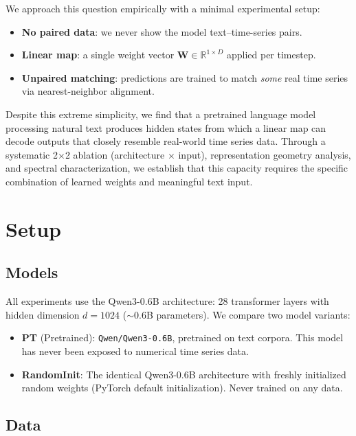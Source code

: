 \documentclass[11pt,a4paper]{article}
\newcommand{\R}{\mathbb{R}}
\newcommand{\bW}{\mathbf{W}}
\begin{document}
We approach this question empirically with a minimal experimental setup:
\begin{itemize}[nosep]
    \item \textbf{No paired data}: we never show the model text--time-series pairs.
    \item \textbf{Linear map}: a single weight vector $\bW \in \R^{1 \times D}$ applied per timestep.
    \item \textbf{Unpaired matching}: predictions are trained to match \emph{some} real time series via nearest-neighbor alignment.
\end{itemize}

Despite this extreme simplicity, we find that a pretrained language model processing natural text produces hidden states from which a linear map can decode outputs that closely resemble real-world time series data.
Through a systematic 2$\times$2 ablation (architecture $\times$ input), representation geometry analysis, and spectral characterization, we establish that this capacity requires the specific combination of learned weights and meaningful text input.

\section{Setup}

\subsection{Models}

All experiments use the Qwen3-0.6B architecture: 28 transformer layers with hidden dimension $d = 1024$ ($\sim$0.6B parameters).
We compare two model variants:

\begin{itemize}[nosep]
    \item \textbf{PT} (Pretrained): \texttt{Qwen/Qwen3-0.6B}, pretrained on text corpora. This model has never been exposed to numerical time series data.
    \item \textbf{RandomInit}: The identical Qwen3-0.6B architecture with freshly initialized random weights (PyTorch default initialization). Never trained on any data.
\end{itemize}

\subsection{Data}
\end{document}
